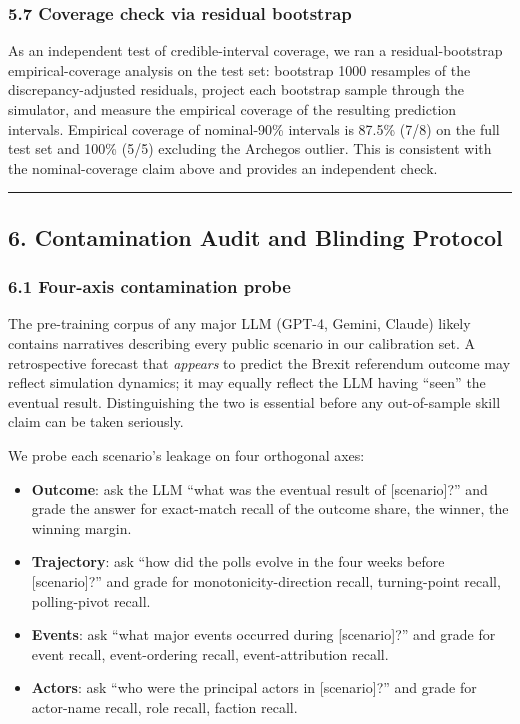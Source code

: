 \documentclass[
]{article}
\providecommand{\tightlist}{%
  \setlength{\itemsep}{0pt}\setlength{\parskip}{0pt}}
\begin{document}
\subsubsection{5.7 Coverage check via residual
bootstrap}\label{coverage-check-via-residual-bootstrap}

As an independent test of credible-interval coverage, we ran a
residual-bootstrap empirical-coverage analysis on the test set:
bootstrap 1000 resamples of the discrepancy-adjusted residuals, project
each bootstrap sample through the simulator, and measure the empirical
coverage of the resulting prediction intervals. Empirical coverage of
nominal-90\% intervals is 87.5\% (7/8) on the full test set and 100\%
(5/5) excluding the Archegos outlier. This is consistent with the
nominal-coverage claim above and provides an independent check.

\begin{center}\rule{0.5\linewidth}{0.5pt}\end{center}

\subsection{6. Contamination Audit and Blinding
Protocol}\label{contamination-audit-and-blinding-protocol}

\subsubsection{6.1 Four-axis contamination
probe}\label{four-axis-contamination-probe}

The pre-training corpus of any major LLM (GPT-4, Gemini, Claude) likely
contains narratives describing every public scenario in our calibration
set. A retrospective forecast that \emph{appears} to predict the Brexit
referendum outcome may reflect simulation dynamics; it may equally
reflect the LLM having ``seen'' the eventual result. Distinguishing the
two is essential before any out-of-sample skill claim can be taken
seriously.

We probe each scenario's leakage on four orthogonal axes:

\begin{itemize}
\tightlist
\item
  \textbf{Outcome}: ask the LLM ``what was the eventual result of
  {[}scenario{]}?'' and grade the answer for exact-match recall of the
  outcome share, the winner, the winning margin.
\item
  \textbf{Trajectory}: ask ``how did the polls evolve in the four weeks
  before {[}scenario{]}?'' and grade for monotonicity-direction recall,
  turning-point recall, polling-pivot recall.
\item
  \textbf{Events}: ask ``what major events occurred during
  {[}scenario{]}?'' and grade for event recall, event-ordering recall,
  event-attribution recall.
\item
  \textbf{Actors}: ask ``who were the principal actors in
  {[}scenario{]}?'' and grade for actor-name recall, role recall,
  faction recall.
\end{itemize}
\end{document}

